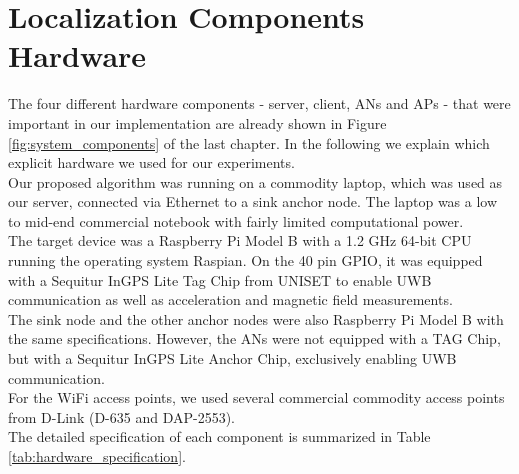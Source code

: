 \section{Localization Components Hardware}
The four different hardware components - server, client, ANs and APs - that were important in our implementation are already shown in Figure \ref{fig:system_components} of the last chapter. In the following we explain which explicit hardware we used for our experiments.\\
\noindent\hspace*{5mm}%
Our proposed algorithm was running on a commodity laptop, which was used as our server, connected via Ethernet to a sink anchor node. The laptop was a low to mid-end commercial notebook with fairly limited computational power.\\
\noindent\hspace*{5mm}%
The target device was a Raspberry Pi Model B \cite{Raspberry} with a 1.2 GHz 64-bit CPU running the operating system Raspian. On the 40 pin GPIO, it was equipped with a Sequitur InGPS Lite Tag Chip from UNISET to enable UWB communication as well as acceleration and magnetic field measurements.\\
\noindent\hspace*{5mm}%
The sink node and the other anchor nodes were also Raspberry Pi Model B with the same specifications. However, the ANs were not equipped with a TAG Chip, but with a Sequitur InGPS Lite Anchor Chip, exclusively enabling UWB communication.\\
\noindent\hspace*{5mm}%
For the WiFi access points, we used several commercial commodity access points from D-Link (D-635 and DAP-2553).\\
\noindent\hspace*{5mm}%
The detailed specification of each component is summarized in Table \ref{tab:hardware_specification}.
